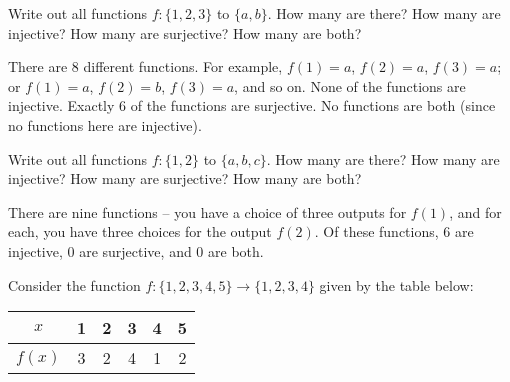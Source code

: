 \begin{questions}


\question Write out all functions $f: \{1,2,3\}$ to $\{a,b\}$.  How many are there?  How many are injective?  How many are surjective?  How many are both?

	\begin{answer}
	There are 8 different functions.  For example, $f(1) = a$, $f(2) = a$, $f(3) = a$; or $f(1) = a$, $f(2) = b$, $f(3) = a$, and so on.  None of the functions are injective.  Exactly 6 of the functions are surjective.  No functions are both (since no functions here are injective).
	\end{answer}
	
	
	

\question Write out all functions $f: \{1,2\}$ to $\{a,b,c\}$.  How many are there?  How many are injective?  How many are surjective?  How many are both?

	\begin{answer}
	There are nine functions -- you have a choice of three outputs for $f(1)$, and for each, you have three choices for the output $f(2)$.  Of these functions, 6 are injective, 0 are surjective, and 0 are both.
	\end{answer}
	
	
	

\question Consider the function $f:\{1,2,3,4,5\} \to \{1,2,3,4\}$ given by the table below:

\begin{center}
\begin{tabular}{c||c|c|c|c|c}
              $x$ & 1 & 2 & 3 & 4 & 5 \\ \hline
              $f(x)$ & 3 & 2 & 4 & 1 & 2
            \end{tabular}
\end{center}


	\begin{answer}
		\begin{parts}

\end{parts}
\end{answer}
\end{questions}
